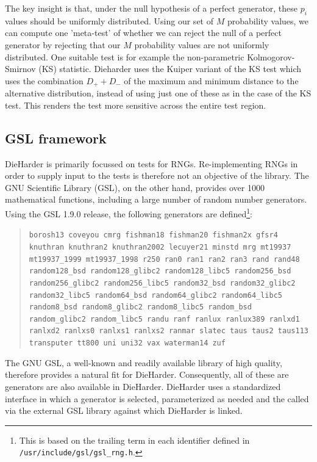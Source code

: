 \documentclass[12pt]{article}
\begin{document}
The key insight is that, under the null hypothesis of a perfect generator,
these $p_i$ values should be uniformly distributed. Using our set of $M$
probability values, we can compute one 'meta-test' of whether we can reject
the null of a perfect generator by rejecting that our $M$ probability values
are not uniformly distributed. One suitable test is for example the
non-parametric Kolmogorov-Smirnov (KS) statistic.  Dieharder uses the Kuiper
variant  of the KS test which uses the combination $D_+
+ D_-$ of the maximum and minimum distance to the alternative distribution,
instead of using just one of these as in the case of the KS test.  This renders
the test more sensitive across the entire test region.

\subsection{GSL framework}

DieHarder is primarily focussed on tests for RNGs. Re-implementing RNGs in
order to supply input to the tests is therefore not an objective of the
library.  The GNU Scientific Library (GSL), on the other hand, provides 
over 1000 mathematical functions, including a large number of random number
generators.  Using the GSL 1.9.0 release, the following generators
are defined\footnote{This is based on the trailing term in each identifier
  defined in \texttt{/usr/include/gsl/gsl\_rng.h}.}:
\begin{quote}
  \small
  \texttt{borosh13 coveyou cmrg
    fishman18 fishman20 fishman2x gfsr4 knuthran knuthran2 knuthran2002
    lecuyer21 minstd mrg mt19937 mt19937\_1999 mt19937\_1998 r250 ran0 ran1
    ran2 ran3 rand rand48 random128\_bsd random128\_glibc2 random128\_libc5
    random256\_bsd random256\_glibc2 random256\_libc5 random32\_bsd
    random32\_glibc2 random32\_libc5 random64\_bsd random64\_glibc2
    random64\_libc5 random8\_bsd random8\_glibc2 random8\_libc5 random\_bsd
    random\_glibc2 random\_libc5 randu ranf ranlux ranlux389 ranlxd1 ranlxd2
    ranlxs0 ranlxs1 ranlxs2 ranmar slatec taus taus2 taus113 transputer tt800
    uni uni32 vax waterman14 zuf} 
\end{quote}
The GNU GSL, a well-known and readily available library of high quality,
therefore provides a natural fit for DieHarder. Consequently, all of these
are generators are also available in DieHarder. DieHarder uses a standardized
interface in which a generator is selected, parameterized as needed and the
called via the external GSL library against which DieHarder is linked.
\end{document}

